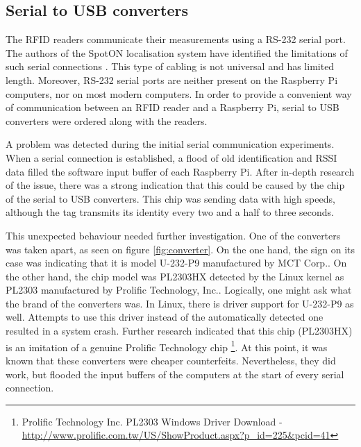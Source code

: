 \subsection{Serial to USB converters}
\label{subsec:sertousb}

The RFID readers communicate their measurements using a RS-232 serial port. The authors of the SpotON localisation system have identified the limitations of such serial connections \cite[p. 6]{Hightower2000}. This type of cabling is not universal and has limited length. Moreover, RS-232 serial ports are neither present on the Raspberry Pi computers, nor on most modern computers. In order to provide a convenient way of communication between an RFID reader and a Raspberry Pi, serial to USB converters were ordered along with the readers.

A problem was detected during the initial serial communication experiments. When a serial connection is established, a flood of old identification and RSSI data filled the software input buffer of each Raspberry Pi. After in-depth research of the issue, there was a strong indication that this could be caused by the chip of the serial to USB converters. This chip was sending data with high speeds, although the tag transmits its identity every two and a half to three seconds. 

This unexpected behaviour needed further investigation. One of the converters was taken apart, as seen on figure \ref{fig:converter}. On the one hand, the sign on its case was indicating that it is model U-232-P9 manufactured by MCT Corp.. On the other hand, the chip model was PL2303HX detected by the Linux kernel as PL2303 manufactured by Prolific Technology, Inc.. Logically, one might ask what the brand of the converters was. In Linux, there is driver support for U-232-P9 as well. Attempts to use this driver instead of the automatically detected one resulted in a system crash. Further research indicated that this chip (PL2303HX) is an imitation of a genuine Prolific Technology chip \footnote{Prolific Technology Inc. PL2303 Windows Driver Download - \url{http://www.prolific.com.tw/US/ShowProduct.aspx?p_id=225&pcid=41}}. At this point, it was known that these converters were cheaper counterfeits. Nevertheless, they did work, but flooded the input buffers of the computers at the start of every serial connection.

